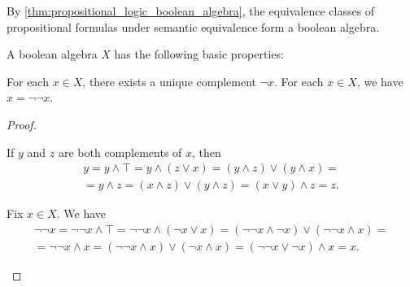 \begin{example}\label{ex:boolean_algebra}
  By \cref{thm:propositional_logic_boolean_algebra}, the equivalence classes of propositional formulas under semantic equivalence form a boolean algebra.
\end{example}

\begin{proposition}\label{thm:boolean_algebra_properties}
  A boolean algebra \( X \) has the following basic properties:
  \begin{thmenum}
     For each \( x \in X \), there exists a unique complement \( \neg x \).
     For each \( x \in X \), we have \( x = \neg \neg x \).
  \end{thmenum}
\end{proposition}
\begin{proof}\mbox{}
  \begin{itemize}
     If \( y \) and \( z \) are both complements of \( x \), then
    \begin{align*}
      y
      =
      y \land \top
      =
      y \land (z \lor x)
      =
      (y \land z) \lor (y \land x)
      = \\ =
      y \land z
      =
      (x \land z) \lor (y \land z)
      =
      (x \lor y) \land z
      =
      z.
    \end{align*}

     Fix \( x \in X \). We have
    \begin{align*}
      \neg \neg x
      =
      \neg \neg x \land \top
      =
      \neg \neg x \land (\neg x \lor x)
      =
      (\neg \neg x \land \neg x) \lor (\neg \neg x \land x)
      = \\ =
      \neg \neg x \land x
      =
      (\neg \neg x \land x) \lor (\neg x \land x)
      =
      (\neg \neg x \lor \neg x) \land x
      =
      x.
    \end{align*}
  \end{itemize}
\end{proof}

